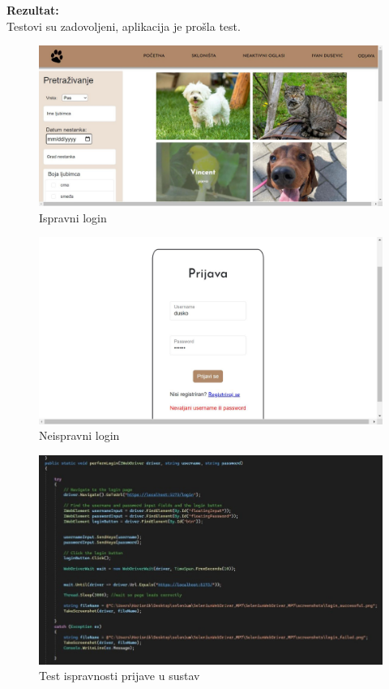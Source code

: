 			\noindent \textbf{Rezultat:}\\
				Testovi su zadovoljeni, aplikacija je prošla test.\\
				\begin{figure}[H]
					\includegraphics[width=\textwidth]{uspjesni_login.JPEG}
					\centering
					\caption{Ispravni login}
					\label{fig:uspjesnilogin}
				\end{figure}
				\begin{figure}[H]
					\includegraphics[width=\textwidth]{krivi_login.JPEG}
					\centering
					\caption{Neispravni login}
					\label{fig:neuspjesnilogin}
				\end{figure}
				\begin{figure}[H]
					\includegraphics[width=\textwidth]{2test_login.JPEG}
					\centering
					\caption{Test ispravnosti prijave u sustav}
					\label{fig:testlogin}
				\end{figure}
			
